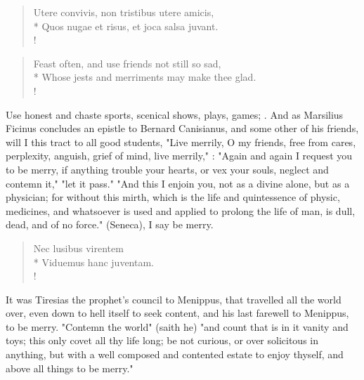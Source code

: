 {\begin{latin}
\begin{verse}%
Utere convivis, non tristibus utere amicis,\\*
Quos nugae et risus, et joca salsa juvant.\\!
\end{verse}%
\end{latin}
\translationrule%
\begin{verse}%
Feast often, and use friends not still so sad,\\*
Whose jests and merriments may make thee glad.\\!
\end{verse}%

Use honest and chaste sports, scenical shows, plays, games; . And as Marsilius Ficinus concludes an epistle to Bernard Canisianus, and some other of his friends, will I this tract to all good students, "Live merrily, O my friends, free from cares, perplexity, anguish, grief of mind, live merrily," : "Again and again I request you to be merry, if anything trouble your hearts, or vex your souls, neglect and contemn it," "let it pass." "And this I enjoin you, not as a divine alone, but as a physician; for without this mirth, which is the life and quintessence of physic, medicines, and whatsoever is used and applied to prolong the life of man, is dull, dead, and of no force."  (Seneca), I say be merry.

\begin{latin}
\begin{verse}%
Nec lusibus virentem\\*
Viduemus hanc juventam.\\!
\end{verse}%
\end{latin}
%

It was Tiresias the prophet's council to Menippus, that travelled all the world over, even down to hell itself to seek content, and his last farewell to Menippus, to be merry. "Contemn the world" (saith he) "and count that is in it vanity and toys; this only covet all thy life long; be not curious, or over solicitous in anything, but with a well composed and contented estate to enjoy thyself, and above all things to be merry."

}
